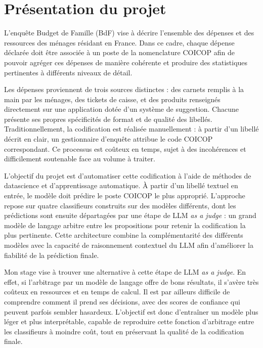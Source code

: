 \documentclass{rapportCS}
\begin{document}
\section{Présentation du projet}

L'enquête Budget de Famille (BdF) vise à décrire l'ensemble des dépenses et des ressources des ménages résidant en France. Dans ce cadre, chaque dépense déclarée doit être associée à un poste de la nomenclature COICOP afin de pouvoir agréger ces dépenses de manière cohérente et produire des statistiques pertinentes à différents niveaux de détail. \newline

Les dépenses proviennent de trois sources distinctes : des carnets remplis à la main par les ménages, des tickets de caisse, et des produits renseignés directement sur une application dotée d'un système de suggestion. Chacune présente ses propres spécificités de format et de qualité des libellés. Traditionnellement, la codification est réalisée manuellement : à partir d'un libellé décrit en clair, un gestionnaire d'enquête attribue le code COICOP correspondant. Ce processus est coûteux en temps, sujet à des incohérences et difficilement soutenable face au volume à traiter. \newline

L'objectif du projet est d'automatiser cette codification à l'aide de méthodes de datascience et d'apprentissage automatique. À partir d'un libellé textuel en entrée, le modèle doit prédire le poste COICOP le plus approprié. L'approche repose sur quatre classifieurs construits sur des modèles différents, dont les prédictions sont ensuite départagées par une étape de LLM \textit{as a judge} : un grand modèle de langage arbitre entre les propositions pour retenir la codification la plus pertinente. Cette architecture combine la complémentarité des différents modèles avec la capacité de raisonnement contextuel du LLM afin d'améliorer la fiabilité de la prédiction finale. \newline

Mon stage vise à trouver une alternative à cette étape de LLM \textit{as a judge}. En effet, si l'arbitrage par un modèle de langage offre de bons résultats, il s'avère très coûteux en ressources et en temps de calcul. Il est par ailleurs difficile de comprendre comment il prend ses décisions, avec des scores de confiance qui peuvent parfois sembler hasardeux. L'objectif est donc d'entraîner un modèle plus léger et plus interprétable, capable de reproduire cette fonction d'arbitrage entre les classifieurs à moindre coût, tout en préservant la qualité de la codification finale. 
\end{document}
